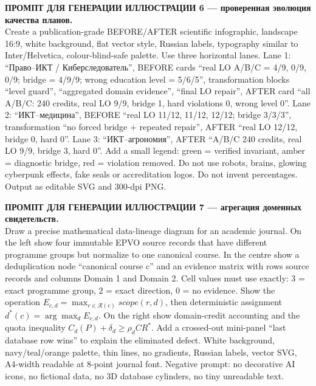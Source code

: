 \documentclass[twoside,11pt]{article}
\begin{document}
\medskip
\noindent\colorbox{yellow!25}{\parbox{0.96\linewidth}{
\textbf{ПРОМПТ ДЛЯ ГЕНЕРАЦИИ ИЛЛЮСТРАЦИИ 6 --- проверенная эволюция качества планов.}\\
Create a publication-grade BEFORE/AFTER scientific infographic, landscape 16:9,
white background, flat vector style, Russian labels, typography similar to
Inter/Helvetica, colour-blind-safe palette. Use three horizontal lanes. Lane 1:
``Право--ИКТ / Киберследователь'', BEFORE cards ``real LO A/B/C = 4/9,
0/9, 0/9; bridge = 4/9/9; wrong education level = 5/6/5'', transformation
blocks ``level guard'', ``aggregated domain evidence'', ``final LO repair'',
AFTER card ``all A/B/C: 240 credits, real LO 9/9, bridge 1, hard violations 0,
wrong level 0''. Lane 2: ``ИКТ--медицина'', BEFORE ``real LO 11/12, 11/12,
12/12; bridge 3/3/3'', transformation ``no forced bridge + repeated repair'',
AFTER ``real LO 12/12, bridge 0, hard 0''. Lane 3: ``ИКТ--агрономия'', AFTER
``A/B/C 240 credits, real LO 9/9, bridge 3, hard 0''. Add a small legend:
green = verified invariant, amber = diagnostic bridge, red = violation removed.
Do not use robots, brains, glowing cyberpunk effects, fake seals or accreditation
logos. Do not invent percentages. Output as editable SVG and 300-dpi PNG.
}}

\medskip
\noindent\colorbox{yellow!25}{\parbox{0.96\linewidth}{
\textbf{ПРОМПТ ДЛЯ ГЕНЕРАЦИИ ИЛЛЮСТРАЦИИ 7 --- агрегация доменных свидетельств.}\\
Draw a precise mathematical data-lineage diagram for an academic journal. On
the left show four immutable EPVO source records that have different programme
groups but normalize to one canonical course. In the centre show a deduplication
node ``canonical course c'' and an evidence matrix with rows source records and
columns Domain 1 and Domain 2. Cell values must use exactly: 3 = exact programme
group, 2 = exact direction, 0 = no evidence. Show the operation
$E_{c,d}=\max_{r\in\mathcal{R}(c)}scope(r,d)$, then deterministic assignment
$d^*(c)=\arg\max_d E_{c,d}$. On the right show domain-credit accounting and the
quota inequality $C_d(P)+\delta_d\ge\rho_d CR^*$. Add a crossed-out mini-panel
``last database row wins'' to explain the eliminated defect. White background,
navy/teal/orange palette, thin lines, no gradients, Russian labels, vector SVG,
A4-width readable at 8-point journal font. Negative prompt: no decorative AI
icons, no fictional data, no 3D database cylinders, no tiny unreadable text.
}}
\end{document}

